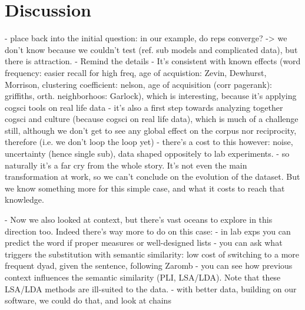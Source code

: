 \section{Discussion}

- place back into the initial question: in our example, do reps converge?
-> we don't know because we couldn't test (ref. sub models and complicated data), but there is attraction.
  - Remind the details
  - It's consistent with known effects (word frequency: easier recall for high freq, age of acquistion: Zevin, Dewhurst, Morrison, clustering coefficient: nelson, age of acquisition (corr pagerank): griffiths, orth. neighborhoos: Garlock), which is interesting, because it's applying cogsci tools on real life data
  - it's also a first step towards analyzing together cogsci and culture (because cogsci on real life data), which is much of a challenge still, although we don't get to see any global effect on the corpus nor reciprocity, therefore (i.e. we don't loop the loop yet)
  - there's a cost to this however: noise, uncertainty (hence single sub), data shaped oppositely to lab experiments.
  - so naturally it's a far cry from the whole story. It's not even the main transformation at work, so we can't conclude on the evolution of the dataset. But we know something more for this simple case, and what it costs to reach that knowledge.

- Now we also looked at context, but there's vast oceans to explore in this direction too. Indeed there's way more to do on this case:
  - in lab exps you can predict the word if proper measures or well-designed lists
  - you can ask what triggers the substitution with semantic similarity: low cost of switching to a more frequent dyad, given the sentence, following Zaromb
  - you can see how previous context influences the semantic similarity (PLI, LSA/LDA). Note that these LSA/LDA methods are ill-suited to the data.
  - with better data, building on our software, we could do that, and look at chains

